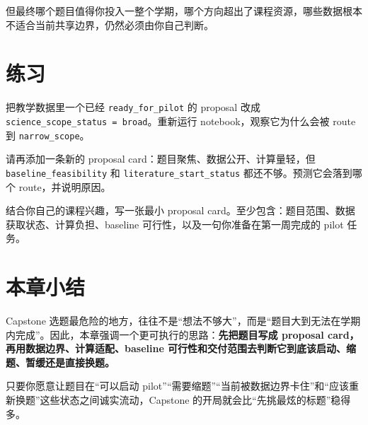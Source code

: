 但最终哪个题目值得你投入一整个学期，哪个方向超出了课程资源，哪些数据根本不适合当前共享边界，仍然必须由你自己判断。

\section{练习}

\begin{exercisebox}[基础练习]
把教学数据里一个已经 \texttt{ready\_for\_pilot} 的 proposal 改成 \texttt{science\_scope\_status = broad}。重新运行 notebook，观察它为什么会被 route 到 \texttt{narrow\_scope}。
\end{exercisebox}

\begin{exercisebox}[进阶练习]
请再添加一条新的 proposal card：题目聚焦、数据公开、计算量轻，但 \texttt{baseline\_feasibility} 和 \texttt{literature\_start\_status} 都还不够。预测它会落到哪个 route，并说明原因。
\end{exercisebox}

\begin{exercisebox}[开放练习]
结合你自己的课程兴趣，写一张最小 proposal card。至少包含：题目范围、数据获取状态、计算负担、baseline 可行性，以及一句你准备在第一周完成的 pilot 任务。
\end{exercisebox}

\section{本章小结}

Capstone 选题最危险的地方，往往不是“想法不够大”，而是“题目大到无法在学期内完成”。因此，本章强调一个更可执行的思路：\textbf{先把题目写成 proposal card，再用数据边界、计算适配、baseline 可行性和交付范围去判断它到底该启动、缩题、暂缓还是直接换题。}

只要你愿意让题目在“可以启动 pilot”“需要缩题”“当前被数据边界卡住”和“应该重新换题”这些状态之间诚实流动，Capstone 的开局就会比“先挑最炫的标题”稳得多。
